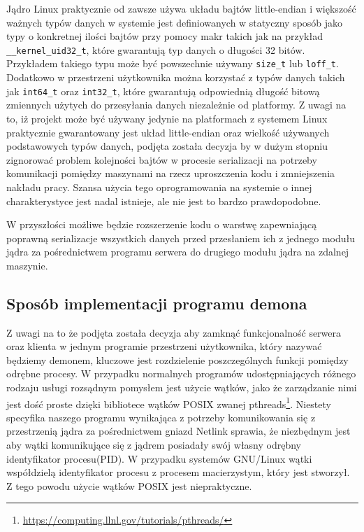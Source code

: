\documentclass[11pt]{scrartcl}
\begin{document}
Jądro Linux praktycznie od zawsze używa układu bajtów little-endian i większość ważnych typów danych w systemie jest definiowanych w statyczny sposób jako typy o konkretnej ilości bajtów przy pomocy makr takich jak na przykład \texttt{\_\_kernel\_uid32\_t}, które gwarantują typ danych o długości 32 bitów. Przykładem takiego typu może być powszechnie używany \texttt{size\_t} lub \texttt{loff\_t}. Dodatkowo w przestrzeni użytkownika można korzystać z typów danych takich jak \texttt{int64\_t} oraz \texttt{int32\_t}, które gwarantują odpowiednią długość bitową zmiennych użytych do przesyłania danych niezależnie od platformy. Z uwagi na to, iż projekt może być używany jedynie na platformach z systemem Linux praktycznie gwarantowany jest układ little-endian oraz wielkość używanych podstawowych typów danych, podjęta została decyzja by w dużym stopniu zignorować problem kolejności bajtów w procesie serializacji na potrzeby komunikacji pomiędzy maszynami na rzecz uproszczenia kodu i zmniejszenia nakładu pracy. Szansa użycia tego oprogramowania na systemie o innej charakterystyce jest nadal istnieje, ale nie jest to bardzo prawdopodobne.

W przyszłości możliwe będzie rozszerzenie kodu o warstwę zapewniającą poprawną serializacje wszystkich danych przed przesłaniem ich z jednego modułu jądra za pośrednictwem programu serwera do drugiego modułu jądra na zdalnej maszynie.

\subsection{Sposób implementacji programu demona}
\label{daemonimplementation}

Z uwagi na to że podjęta została decyzja aby zamknąć funkcjonalność serwera oraz klienta w jednym programie przestrzeni użytkownika, który nazywać będziemy demonem, kluczowe jest rozdzielenie poszczególnych funkcji pomiędzy odrębne procesy. W przypadku normalnych programów udostępniających różnego rodzaju usługi rozsądnym pomysłem jest użycie wątków, jako że zarządzanie nimi jest dość proste dzięki bibliotece wątków POSIX zwanej pthreads\footnote{\url{https://computing.llnl.gov/tutorials/pthreads/}}. Niestety specyfika naszego programu wynikająca z potrzeby komunikowania się z przestrzenią jądra za pośrednictwem gniazd Netlink sprawia, że niezbędnym jest aby wątki komunikujące się z jądrem posiadały swój własny odrębny identyfikator procesu(PID). W przypadku systemów GNU/Linux wątki współdzielą identyfikator procesu z procesem macierzystym, który jest stworzył. Z tego powodu użycie wątków POSIX jest niepraktyczne.
\end{document}
